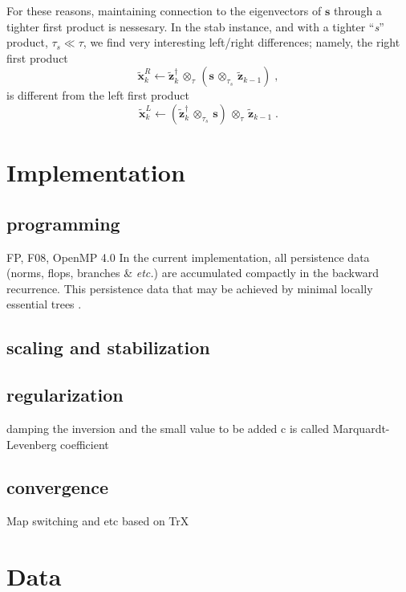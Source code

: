 \documentclass[letterpaper,twocolumn,amsmath,amsfont,amssymb,english,aps,jcp,preprintnumbers,groupaddress,nofootinbib,tightenlines,floatfix]{revtex4}
\newcommand{\mat}[1]{\boldsymbol{#1}}
\newcommand{\ot}{  {\scriptstyle \otimes}_{ \tau } }
\newcommand{\ots}{ {\scriptstyle \otimes}_{ \! \tau_s } }
\theoremstyle{plain}
\theoremstyle{remark}
\theoremstyle{plain}
\begin{document}
For these reasons, maintaining connection to the eigenvectors of $\mat{s}$ through 
a tighter first product is nessesary.  In the stab instance, and with a 
tighter ``{\em s}'' product, $\tau_s \ll \tau$, we find very interesting left/right differences; 
namely, the right first product 
\begin{equation} 
\widetilde{\mat{x}}^R_k \leftarrow \widetilde{\mat{z}}^\dagger_{k} \, \ot  \, \left( \mat{s} \,  \ots \, \widetilde{\mat{z}}_{k-1}  \right) \; ,
\end{equation}
is  different from the left first product 
\begin{equation} 
\widetilde{\mat{x}}^L_k \leftarrow \left(  \widetilde{\mat{z}}^\dagger_{k} \, \ots \, \mat{s} \right) \,  \ot  \, \widetilde{\mat{z}}_{k-1} \; .
\end{equation}

\section{Implementation}

\subsection{programming}

FP, F08, OpenMP 4.0
In the current implementation, all persistence data
(norms, flops, branches \& {\em etc.}) are accumulated compactly in the backward recurrence.  This persistence data
 that may be achieved by minimal locally essential trees \cite{}.


\subsection{scaling and stabilization}

\subsection{regularization}
damping the inversion and the small value to be added c is called Marquardt-Levenberg coefficient

\subsection{convergence}

Map switching and etc based on TrX

\section{Data} \label{data}
\end{document}
